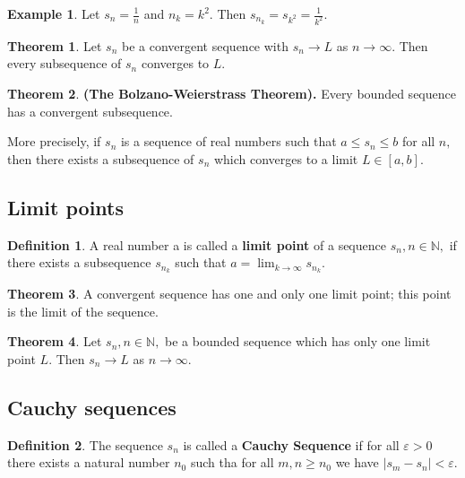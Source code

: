 \documentclass[12pt, a4paper]{article}
\newcommand{\bb}[1]{\mathbb{#1}}
\newcommand{\f}[2]{\frac{#1}{#2}}
\theoremstyle{definition}
\newtheorem{definition}{Definition}[section]
\newtheorem{theorem}{Theorem}[section]
\newtheorem*{example}{Example}
\theoremstyle{plain}
\begin{document}
\begin{example}
Let $s_n=\f{1}{n}$ and $n_k=k^2.$ Then $s_{n_k}=s_{k^2}=\f{1}{k^2}.$
\end{example}

\begin{theorem}
Let $s_n$ be a convergent sequence with $s_n \to L$ as $n \to \infty.$ Then every subsequence of $s_n$ converges to $L.$
\end{theorem}

\begin{theorem}\textbf{(The Bolzano-Weierstrass Theorem).}
Every bounded sequence has a convergent subsequence. 

More precisely, if $s_n$ is a sequence of real numbers such that $a \leq s_n \leq b$ for all $n,$ then there exists a subsequence of $s_n$ which converges to a limit $L \in [a, b].$
\end{theorem}

\subsection{Limit points}

\begin{definition}
A real number a is called a \textbf{limit point} of a sequence $s_n, n \in \bb{N},$ if there exists a subsequence $s_{n_k}$ such that $a = \lim_{k\to\infty} s_{n_k}.$
\end{definition}

\begin{theorem}
A convergent sequence has one and only one limit point; this point is the limit of the sequence.
\end{theorem}

\begin{theorem}
Let $s_n, n \in \bb{N},$ be a bounded sequence which has only one limit point $L.$ Then $s_n \to L$ as $n\to\infty.$
\end{theorem}

\subsection{Cauchy sequences}

\begin{definition}
The sequence $s_n$ is called a \textbf{Cauchy Sequence} if for all $\varepsilon>0$ there exists a natural number $n_0$ such tha for all $m,n \geq n_0$ we have $|s_m-s_n|<\varepsilon.$
\end{definition}
\end{document}
